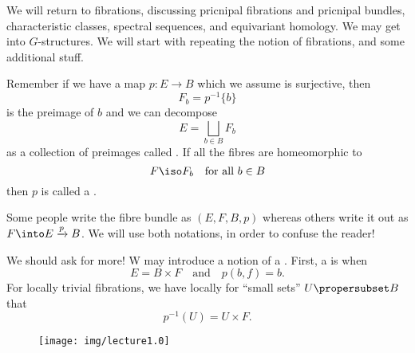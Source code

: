 
We will return to fibrations, discussing pricnipal fibrations and
pricnipal bundles, characteristic classes, spectral sequences,
and equivariant homology. We may get into $G$-structures. We will
start with repeating the notion of fibrations, and some
additional stuff.

Remember if we have a map $p\colon E\to B$ which we assume is
surjective, then 
\begin{equation}
F_{b}=p^{-1}\{b\}
\end{equation}
is the preimage of $b$ and we can decompose
\begin{equation}
E = \bigsqcup_{b\in B}F_{b}
\end{equation}
as a collection of preimages called . If all the
fibres are homeomorphic to
\begin{equation}
F\iso F_{b}\quad\mbox{for all }b\in B
\end{equation}
then $p$ is called a . 

\begin{rmk}[Notation]
Some people write the fibre bundle as $(E,F,B,p)$ whereas others
write it out as $F\into E\xrightarrow{p}B$. We will use both
notations, in order to confuse the reader!
\end{rmk}

We should ask for more!
W may introduce a notion of a . 
First, a  is when
\begin{equation}
E=B\times F\quad\mbox{and}\quad p(b,f)=b.
\end{equation}
For locally trivial fibrations, we have locally for ``small
sets'' $U\propersubset B$ that 
\begin{equation}
p^{-1}(U)= U\times F.
\end{equation}

\begin{wrapfigure}{r}{0.75in}
  \vspace{-12pt}
  \texttt{[image: img/lecture1.0]}
\end{wrapfigure}

